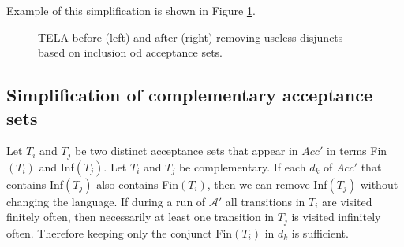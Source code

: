\documentclass[
  digital, %
  twoside, %
  table,   %
  lof,     %
  lot,     %
]{fithesis3}
\begin{document}
Example of this simplification is shown in Figure \ref{fig:inclusion_remdis}.

\begin{figure}[h]
  \centering
  \caption{TELA before (left) and after (right) removing useless disjuncts based on inclusion od acceptance sets.}
  \label{fig:inclusion_remdis}
\end{figure}

\subsection{Simplification of complementary acceptance sets}
Let $T_i$ and $T_j$ be two distinct acceptance sets that appear in $Acc'$ in terms Fin$(T_i)$ and Inf$(T_j)$. Let $T_i$ and $T_j$ be complementary. If each $d_k$ of $Acc'$ that contains Inf$(T_j)$ also contains Fin$(T_i)$, then we can remove Inf$(T_j)$ without changing the language. If during a run of $\mathcal{A'}$ all transitions in $T_i$ are visited finitely often, then necessarily at least one transition in $T_j$ is visited infinitely often. Therefore keeping only the conjunct Fin$(T_i)$ in $d_k$ is sufficient. 
\end{document}
